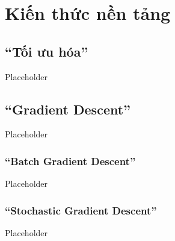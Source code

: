\chapter{Kiến thức nền tảng}
\label{Chapter2}

\section{``Tối ưu hóa''}

Placeholder

\section{``Gradient Descent''}

Placeholder

\subsection{``Batch Gradient Descent''}

Placeholder

\subsection{``Stochastic Gradient Descent''}

Placeholder